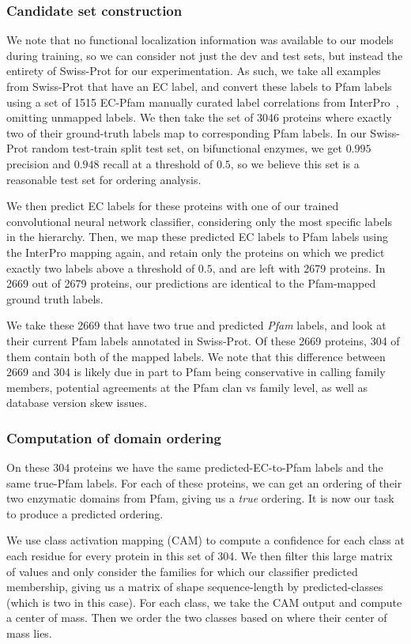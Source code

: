 \subsubsection*{Candidate set construction}
We note that no functional localization information was available to our models during training, so we can consider not just the dev and test sets, but instead the entirety of Swiss-Prot for our experimentation. As such, we take all examples from Swiss-Prot that have an EC label, and convert these labels to Pfam labels using a set of 1515 EC-Pfam manually curated label correlations from InterPro~\cite{mitchell2015interpro}, omitting unmapped labels. We then take the set of 3046 proteins where exactly two of their ground-truth labels map to corresponding Pfam labels. In our Swiss-Prot random test-train split test set, on bifunctional enzymes, we get $0.995$ precision and $0.948$ recall at a threshold of $0.5$, so we believe this set is a reasonable test set for ordering analysis.

We then predict EC labels for these proteins with one of our trained convolutional neural network classifier, considering only the most specific labels in the hierarchy. Then, we map these predicted EC labels to Pfam labels using the InterPro mapping again, and retain only the proteins on which we predict exactly two labels above a threshold of $0.5$, and are left with 2679 proteins. In 2669 out of 2679 proteins, our predictions are identical to the Pfam-mapped ground truth labels. 

We take these 2669 that have two true and predicted \textit{Pfam} labels, and look at their current Pfam labels annotated in Swiss-Prot. Of these 2669 proteins, 304 of them contain both of the mapped labels. We note that this difference between 2669 and 304 is likely due in part to Pfam being conservative in calling family members, potential agreements at the Pfam clan vs family level, as well as database version skew issues.

\subsubsection*{Computation of domain ordering}
On these 304 proteins we have the same predicted-EC-to-Pfam labels and the same true-Pfam labels. For each of these proteins, we can get an ordering of their two enzymatic domains from Pfam, giving us a \textit{true} ordering. It is now our task to produce a predicted ordering.

We use class activation mapping (CAM) to compute a confidence for each class at each residue for every protein in this set of 304. We then filter this large matrix of values and only consider the families for which our classifier predicted membership, giving us a matrix of shape sequence-length by predicted-classes (which is two in this case). For each class, we take the CAM output and compute a center of mass. Then we order the two classes based on where their center of mass lies.



